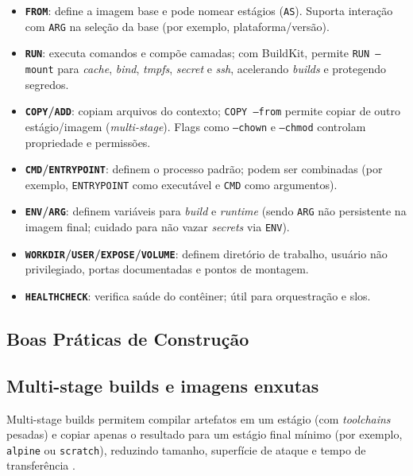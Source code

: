 \begin{itemize}
    \item \textbf{\texttt{FROM}}: define a imagem base e pode nomear estágios (\texttt{AS}). Suporta interação com \texttt{ARG} na seleção da base (por exemplo, plataforma/versão). \cite{dockerfile_ref} 
    
    \item \textbf{\texttt{RUN}}: executa comandos e compõe camadas; com BuildKit, permite \texttt{RUN --mount} para \textit{cache}, \textit{bind}, \textit{tmpfs}, \textit{secret} e \textit{ssh}, acelerando \textit{builds} e protegendo segredos. \cite{dockerfile_ref} 
    \item \textbf{\texttt{COPY}/\texttt{ADD}}: copiam arquivos do contexto; \texttt{COPY --from} permite copiar de outro estágio/imagem (\textit{multi-stage}). Flags como \texttt{--chown} e \texttt{--chmod} controlam propriedade e permissões. \cite{dockerfile_ref}
    \item \textbf{\texttt{CMD}/\texttt{ENTRYPOINT}}: definem o processo padrão; podem ser combinadas (por exemplo, \texttt{ENTRYPOINT} como executável e \texttt{CMD} como argumentos). \cite{dockerfile_ref}
    \item \textbf{\texttt{ENV}/\texttt{ARG}}: definem variáveis para \textit{build} e \textit{runtime} (sendo \texttt{ARG} não persistente na imagem final; cuidado para não vazar \textit{secrets} via \texttt{ENV}). \cite{dockerfile_ref}
    \item \textbf{\texttt{WORKDIR}/\texttt{USER}/\texttt{EXPOSE}/\texttt{VOLUME}}: definem diretório de trabalho, usuário não privilegiado, portas documentadas e pontos de montagem. \cite{dockerfile_ref}
    \item \textbf{\texttt{HEALTHCHECK}}: verifica saúde do contêiner; útil para orquestração e \acrshort{slo}s. \cite{dockerfile_ref}
\end{itemize}

\subsection{Boas Práticas de Construção}
\label{sec:docker-best-practices}

\subsection{Multi-stage builds e imagens enxutas}
\label{subsec:multi-stage}

Multi-stage builds permitem compilar artefatos em um estágio (com \textit{toolchains} pesadas) e copiar apenas o resultado para um estágio final mínimo (por exemplo, \texttt{alpine} ou \texttt{scratch}), reduzindo tamanho, superfície de ataque e tempo de transferência \cite{dockerfile_ref}.

